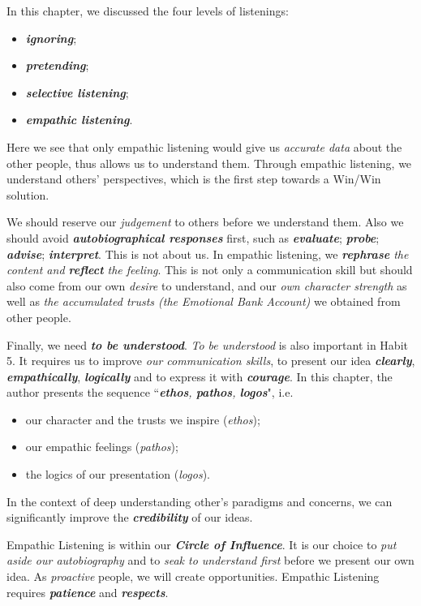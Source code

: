 \documentclass[11pt]{article}
\begin{document}
\begin{enumerate}
\begin{enumerate}
In this chapter, we discussed the four levels of listenings:
\begin{itemize}
\item \emph{\textbf{ignoring}};
\item \emph{\textbf{pretending}};
\item \emph{\textbf{selective listening}};
\item \emph{\textbf{empathic listening}}.
\end{itemize} Here we see that only empathic listening would give us \emph{accurate data} about the other people, thus allows us to understand them. Through empathic listening, we understand others' perspectives, which is the first step towards a Win/Win solution. 

We should reserve our \emph{judgement} to others before we understand them. Also we should avoid \emph{\textbf{autobiographical responses}} first, such as \emph{\textbf{evaluate}};  \emph{\textbf{probe}}; \emph{\textbf{advise}};  \emph{\textbf{interpret}}. This is not about us. In empathic listening, we \emph{\textbf{rephrase} the content and \textbf{reflect} the feeling}. This is not only a communication skill but should also come from our own \emph{desire} to understand, and our \emph{own character strength} as well as \emph{the accumulated trusts (the Emotional Bank Account)} we obtained from other people. 

Finally, we need \emph{\textbf{to be understood}}. \emph{To be understood} is also important in Habit 5. It requires us to improve \emph{our communication skills}, to present our idea \emph{\textbf{clearly}}, \emph{\textbf{empathically}}, \emph{\textbf{logically}} and to express it with \emph{\textbf{courage}}. In this chapter, the author presents the sequence ``\emph{\textbf{ethos}, \textbf{pathos}, \textbf{logos}}", i.e. 
\begin{itemize}
\item our character and the trusts we inspire (\emph{ethos});
\item our empathic feelings (\emph{pathos});
\item the logics of our presentation (\emph{logos}).
\end{itemize} In the context of deep understanding other's paradigms and concerns, we can significantly improve the \emph{\textbf{credibility}} of our ideas.

Empathic Listening is within our \emph{\textbf{Circle of Influence}}. It is our choice to \emph{put aside our autobiography} and to \emph{seak to understand first} before we present our own idea. As \emph{proactive} people, we will create opportunities. Empathic Listening requires \emph{\textbf{patience}} and \emph{\textbf{respects}}.



\end{enumerate}
\end{enumerate}
\end{document}
